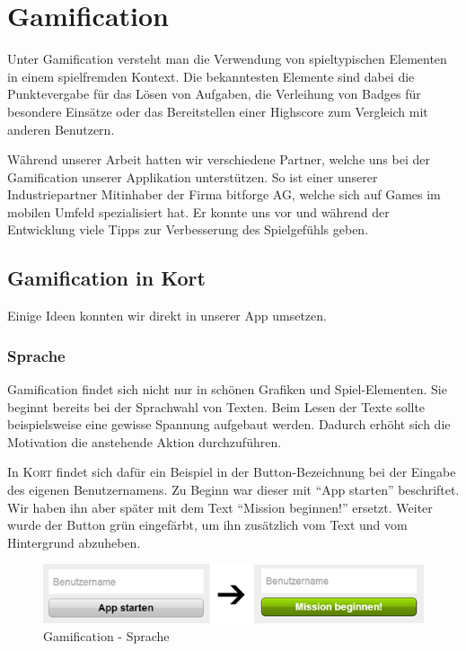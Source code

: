 \chapter{Gamification}
\label{gamification}

Unter Gamification versteht man die Verwendung von spieltypischen Elementen in einem spielfremden Kontext.
Die bekanntesten Elemente sind dabei die Punktevergabe für das Lösen von Aufgaben, die Verleihung von Badges für besondere Einsätze oder das Bereitstellen einer Highscore zum Vergleich mit anderen Benutzern.

Während unserer Arbeit hatten wir verschiedene Partner, welche uns bei der Gamification unserer Applikation unterstützen.
So ist einer unserer Industriepartner Mitinhaber der Firma bitforge AG, welche sich auf Games im mobilen Umfeld spezialisiert hat.
Er konnte uns vor und während der Entwicklung viele Tipps zur Verbesserung des Spielgefühls geben.

\section{Gamification in Kort}
Einige Ideen konnten wir direkt in unserer App umsetzen.

\subsection{Sprache}
Gamification findet sich nicht nur in schönen Grafiken und Spiel-Elementen.
Sie beginnt bereits bei der Sprachwahl von Texten.
Beim Lesen der Texte sollte beispielsweise eine gewisse Spannung aufgebaut werden.
Dadurch erhöht sich die Motivation die anstehende Aktion durchzuführen.

In \textsc{Kort} findet sich dafür ein Beispiel in der Button-Bezeichnung bei der Eingabe des eigenen Benutzernamens.
Zu Beginn war dieser mit "`App starten"' beschriftet.
Wir haben ihn aber später mit dem Text "`Mission beginnen!"' ersetzt.
Weiter wurde der Button grün eingefärbt, um ihn zusätzlich vom Text und vom Hintergrund abzuheben.

\begin{figure}[H]
	\centering
	\includegraphics{images/gamification/gamification-lang-firststeps}
	\caption{Gamification - Sprache}
	\label{gamification-lang-firststeps}
\end{figure}

